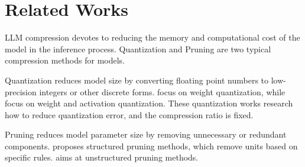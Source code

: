 \section{Related Works}
LLM compression\cite{wang2024modelsurvey}\cite{zhu2023survey} devotes to reducing the memory and computational cost of the model in the inference process. Quantization and Pruning are two typical compression methods for models\cite{deepcompression}.

Quantization reduces model size by converting floating point numbers to low-precision integers or other discrete forms. \cite{gptq} \cite{awq}\cite{llmint8} focus on weight quantization, while\cite{smoothquant} \cite{zeroquant} \cite{os+} focus on weight and activation quantization. These quantization works research how to reduce quantization error, and the compression ratio is fixed. 



Pruning reduces model parameter size by removing unnecessary or redundant components. \cite{llmpruner}\cite{gum} proposes structured pruning methods, which remove units based on specific rules. \cite{sparsegpt}\cite{wanda}\cite{prunerzero} aims at unstructured pruning methods. 

